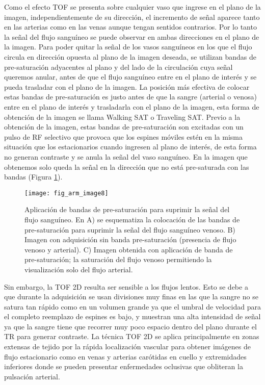 Como el efecto TOF se presenta sobre cualquier vaso que ingrese en el plano de la imagen, independientemente de su dirección, el incremento de señal aparece tanto en las arterias como en las venas aunque tengan sentidos contrarios. Por lo tanto la señal del flujo sanguíneo se puede observar en ambas direcciones en el plano de la imagen. Para poder quitar la señal de los vasos sanguíneos en los que el flujo circula en dirección opuesta al plano de la imagen deseada, se utilizan bandas de pre-saturación adyacentes al plano y del lado de la circulación cuya señal queremos anular, antes de que el flujo sanguíneo entre en el plano de interés y se pueda trasladar con el plano de la imagen. La posición más efectiva de colocar estas bandas de pre-saturación es justo antes de que la sangre (arterial o venosa) entre en el plano de interés y trasladarla con el plano de la imagen, esta forma de obtención de la imagen se llama Walking SAT o Traveling SAT. 
Previo a la obtención de la imagen, estas bandas de pre-saturación son excitadas con un pulso de RF selectivo que provoca que los espines móviles estén en la misma situación que los estacionarios cuando ingresen al plano de interés, de esta forma no generan contraste y se anula la señal del vaso sanguíneo. En la imagen que obtenemos solo queda la señal en la dirección que no está pre-saturada con las bandas (Figura \ref{fig:arm_image8}). 


\begin{figure}[htbp]
\begin{figg}
 \texttt{[image: fig\_arm\_image8]}
 \caption{
Aplicación de bandas de pre-saturación para suprimir la señal del flujo sanguíneo. En A) se esquematiza la colocación de las bandas de pre-saturación para suprimir la señal del flujo sanguíneo venoso. B) Imagen con adquisición sin banda pre-saturación (presencia de flujo venoso y arterial). C) Imagen obtenida con aplicación de banda de pre-saturación; la saturación del flujo venoso permitiendo la visualización solo del flujo arterial. 
 }
 \label{fig:arm_image8}
\end{figg}
\end{figure}



Sin embargo, la TOF 2D resulta ser sensible a los flujos lentos. Esto se debe a que durante la adquisición se usan divisiones muy finas en las que la sangre no se satura tan rápido como en un volumen grande ya que el umbral de velocidad para el completo reemplazo de espines es bajo, y muestran una alta intensidad de señal ya que la sangre tiene que recorrer muy poco espacio dentro del plano durante el TR para generar contraste. La técnica TOF 2D se aplica principalmente en zonas extensas de tejido por la rápida localización vascular para obtener imágenes de flujo estacionario como en venas y arterias carótidas en cuello y extremidades inferiores donde se pueden presentar enfermedades oclusivas que obliteran la pulsación arterial. 

